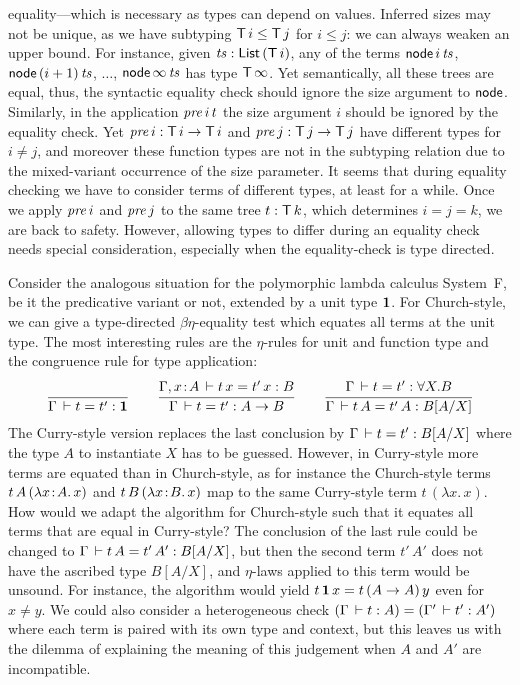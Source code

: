 \documentclass[acmsmall%
]{acmart}\settopmatter{printfolios=true}
\begin{document}
equality---which is necessary as types can depend on values.  Inferred
sizes may not be unique, as we have subtyping $\mathsf{T}\,i \leq \mathsf{T}\,j$ for
$i \leq j$: we can always weaken an upper bound.  For instance, given
$\mathit{ts} : \mathsf{List}\,(\mathsf{T}\,i)$, any of the terms
$\mathsf{node}\,i\,\mathit{ts}$, $\mathsf{node}\,(i+1)\,\mathit{ts}$, $\dots$, $\mathsf{node}\,\infty\,\mathit{ts}$
has type
$\mathsf{T}\,\infty$.  Yet semantically, all these trees are equal,
thus, the syntactic equality check should ignore the size argument to
$\mathsf{node}$.  Similarly, in the application $\mathit{pre}\,i\,t$ the size
argument $i$ should be ignored by the equality check.  Yet
$\mathit{pre}\,i : \mathsf{T}\,i \to \mathsf{T}\,i$ and $\mathit{pre}\,j : \mathsf{T}\,j \to \mathsf{T}\,j$ have
different types for $i \not= j$, and moreover these function types are
not in the subtyping relation due to the mixed-variant occurrence of the
size parameter.  It seems that during equality checking we have to
consider terms of different types, at least for a while.  Once we apply
$\mathit{pre}\,i$ and $\mathit{pre}\,j$ to the same tree $t : \mathsf{T}\,k$, which
determines $i = j = k$, we are back to safety.  However, allowing
types to differ during an equality check needs special consideration, especially
when the equality-check is type directed.

Consider the analogous situation for the polymorphic lambda calculus System~F, be it the predicative variant or not, extended by a unit type $\mathbf{1}$.
For Church-style, we can give a type-directed $\beta\eta$-equality test which equates all terms at the unit type.  The most interesting rules are the $\eta$-rules for unit and function type and the congruence rule for type application:
\begin{gather*}
\renewcommand{\jchk}{:}
\renewcommand{\jinf}{:}
  \ru{}{\Gamma \der t = t' \jchk \One}
\qquad
  \ru{\Gamma, x \of A \der t\,x = t'\,x \jchk B
    }{\Gamma \der t = t' \jchk A \to B}
\qquad
  \ru{\Gamma \der t = t' \jinf \forall X. B
    }{\Gamma \der t\,A = t'\,A \jinf B[A/X]}
\end{gather*}
The Curry-style version replaces the last conclusion by $\Gamma \,\vdash t = t' : B[A/X]$ where the type $A$ to instantiate $X$ has to be guessed.  However, in Curry-style more terms are equated than in Church-style, as for instance the Church-style terms $t\,A\,(\lambda x \!:\! A.\, x)$ and $t\,B\,(\lambda x \!:\! B.\, x)$ map to the same Curry-style term $t\,(\lambda x.\,x)$.  How would we adapt the algorithm for Church-style such that it equates all terms that are equal in Curry-style?  The conclusion of the last rule could be changed to $\Gamma \,\vdash t\,A = t'\,A' : B[A/X]$, but then the second term $t'\,A'$ does not have the ascribed type $B[A/X]$, and $\eta$-laws applied to this term would be unsound.  For instance, the algorithm would yield $t\,\mathbf{1}\,x = t\,(A \to A)\,y$ even for $x \not= y$.
We could also consider a heterogeneous check $(\Gamma \,\vdash t : A) = (\Gamma' \,\vdash t' : A')$ where each term is paired with its own type and context, but this leaves us with the dilemma of explaining the meaning of this judgement when $A$ and $A'$ are incompatible.
\end{document}
